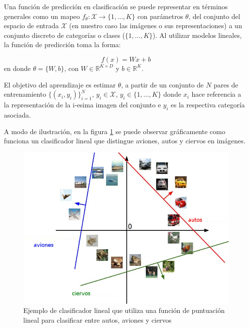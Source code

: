 \documentclass[a4paper,11pt,spanish]{book}
\begin{document}
	  Una función de predicción en clasificación se puede representar en términos generales como un mapeo $f_{\theta}: \mathcal{X}
          {\rightarrow} \{1,\dots,K\}$ con parámetros $\theta$, del conjunto del espacio de entrada $\mathcal{X}$ (en nuestro caso las imágenes o sus
          representaciones) a un conjunto discreto de categorías o clases ($\{1,\dots,K\}$). 
          Al utilizar modelos lineales, la función de predicción toma la forma:
          
          \begin{equation} \label{eq:linear_classifier}
            f(x) = W x + b
          \end{equation}
          en donde $\theta=\{W, b\}$, con $W\in\mathbb{R}^{K \times D}$ y $b\in\mathbb{R}^K$.
          
          El objetivo del aprendizaje es estimar $\theta$, a partir de un conjunto de $N$ pares de entrenamiento $\{(x_i, y_i)\}_{i=1}^N$, $y_i \in \mathcal{X}$, $y_i\in\{1,\dots,K\}$
          donde $x_i$ hace referencia a la representación de la i-esima imagen del conjunto e $y_i$ es la respectiva categoría asociada.
	  
	  A modo de ilustración, en la figura \ref{fig:linear_classifier} se puede observar gráficamente como funciona un clasificador lineal 
	  que distingue aviones, autos y ciervos en imágenes.
	  
	  \begin{figure}[ht]
	    \begin{center}
	     \includegraphics[width=0.8\linewidth]{./img/stanford_linear_class_spanish.jpeg}
	    \end{center}
	    \caption{Ejemplo de clasificador lineal que utiliza una función de puntuación lineal para clasificar entre autos, aviones y ciervos}
	    \label{fig:linear_classifier}
	  \end{figure}
\end{document}
